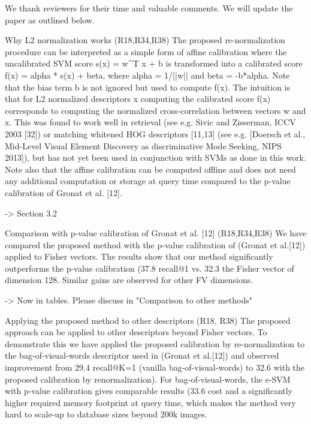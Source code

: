 We thank reviewers for their time and valuable comments. We will
update the paper as outlined below.

Why L2 normalization works (R18,R34,R38)
The proposed re-normalization procedure can be interpreted as a simple
form of affine calibration where the uncalibrated SVM score s(x) = w^T
x + b is transformed into a calibrated score f(x) = alpha * s(x) +
beta, where alpha = 1/||w|| and beta = -b*alpha. Note that the bias
term b is not ignored but used to compute f(x). The intuition is that
for L2 normalized descriptors x computing the calibrated score f(x)
corresponds to computing the normalized cross-correlation between
vectors w and x. This was found to work well in retrieval (see e.g.
Sivic and Zisserman, ICCV 2003 [32]) or matching whitened HOG
descriptors [11,13] (see e.g. [Doersch et al., Mid-Level Visual
Element Discovery as discriminative Mode Seeking, NIPS 2013]), but has
not yet been used in conjunction with SVMs as done in this work. Note
also that the affine calibration can be computed offline and does not
need any additional computation or storage at query time compared to
the p-value calibration of Gronat et al. [12].

-> Section 3.2

Comparison with p-value calibration of Gronat et al. [12] (R18,R34,R38)
We have compared the proposed method with the p-value calibration of
(Gronat et al.[12]) applied to Fisher vectors. The results show that
our method significantly outperforms the p-value calibration (37.8%
recall@1 vs. 32.3%
the Fisher vector of dimension 128. Similar gains are observed for
other FV dimensions.

-> Now in tables. Please discuss in "Comparison to other methods"

Applying the proposed method to other descriptors (R18, R38)
The proposed approach can be applied to other descriptors beyond
Fisher vectors. To demonstrate this we have applied the proposed
calibration by re-normalization to the bag-of-visual-words descriptor
used in (Gronat et al.[12]) and observed improvement from 29.4%
recall@K=1 (vanilla bag-of-visual-words) to 32.6%
with the proposed calibration by renormalization). For
bag-of-visual-words, the e-SVM with p-value calibration gives
comparable results (33.6%
cost and a significantly higher required memory footprint at query
time, which makes the method very hard to scale-up to database sizes
beyond 200k images.

